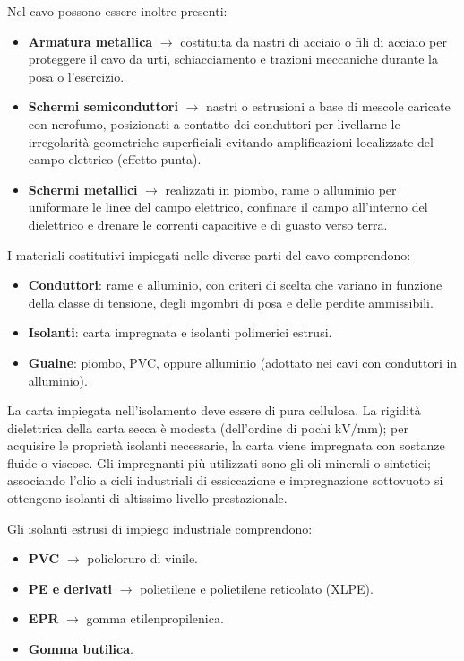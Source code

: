Nel cavo possono essere inoltre presenti:
\begin{itemize}
    \item \textbf{Armatura metallica} $\rightarrow$ costituita da nastri di acciaio o fili di acciaio per proteggere il cavo da urti, schiacciamento e trazioni meccaniche durante la posa o l'esercizio.
    \item \textbf{Schermi semiconduttori} $\rightarrow$ nastri o estrusioni a base di mescole caricate con nerofumo, posizionati a contatto dei conduttori per livellarne le irregolarità geometriche superficiali evitando amplificazioni localizzate del campo elettrico (effetto punta).
    \item \textbf{Schermi metallici} $\rightarrow$ realizzati in piombo, rame o alluminio per uniformare le linee del campo elettrico, confinare il campo all'interno del dielettrico e drenare le correnti capacitive e di guasto verso terra.
\end{itemize}

I materiali costitutivi impiegati nelle diverse parti del cavo comprendono:
\begin{itemize}
    \item \textbf{Conduttori}: rame e alluminio, con criteri di scelta che variano in funzione della classe di tensione, degli ingombri di posa e delle perdite ammissibili.
    \item \textbf{Isolanti}: carta impregnata e isolanti polimerici estrusi.
    \item \textbf{Guaine}: piombo, PVC, oppure alluminio (adottato nei cavi con conduttori in alluminio).
\end{itemize}

La carta impiegata nell'isolamento deve essere di pura cellulosa. La rigidità dielettrica della carta secca è modesta (dell'ordine di pochi $\text{kV/mm}$); per acquisire le proprietà isolanti necessarie, la carta viene impregnata con sostanze fluide o viscose. Gli impregnanti più utilizzati sono gli oli minerali o sintetici; associando l'olio a cicli industriali di essiccazione e impregnazione sottovuoto si ottengono isolanti di altissimo livello prestazionale.

Gli isolanti estrusi di impiego industriale comprendono:
\begin{itemize}
    \item \textbf{PVC} $\rightarrow$ policloruro di vinile.
    \item \textbf{PE e derivati} $\rightarrow$ polietilene e polietilene reticolato (XLPE).
    \item \textbf{EPR} $\rightarrow$ gomma etilenpropilenica.
    \item \textbf{Gomma butilica}.
\end{itemize}

